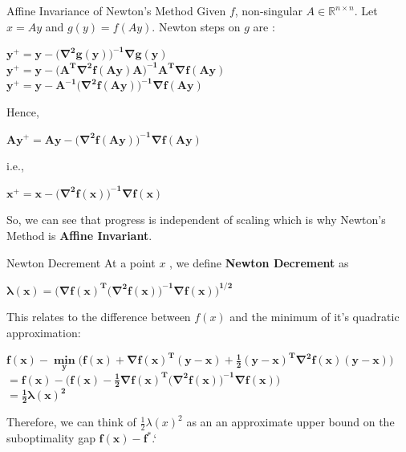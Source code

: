 \documentclass[10pt]{beamer}
\begin{document}
\begin{frame}[fragile]{Affine Invariance of Newton's Method}
 Given $f$, non-singular $A \in \mathbb{R}^{n \times n}$. Let $x=Ay$ and $g(y)=f(Ay)$. Newton steps on $g$ are :
 \begin{center}
     $\boldsymbol{y^{+} = y - \big(\nabla ^{2}g(y)\big)^{-1}\nabla g(y)}$
     \vspace{2mm}\ \\
     $\boldsymbol{y^{+} = y - \big(A^{T}\nabla ^{2}f(Ay)A\big)^{-1}A^{T}\nabla f(Ay)}$
     \vspace{2mm}\ \\
     $\boldsymbol{y^{+} = y - A^{-1}\big(\nabla ^{2}f(Ay)\big)^{-1}\nabla f(Ay)}$
 \end{center}
 Hence,
 \begin{center}
     $\boldsymbol{Ay^{+}=Ay -\big(\nabla ^{2}f(Ay)\big)^{-1}\nabla f(Ay)} $
 \end{center}
 i.e.,
 \begin{center}
     $\boldsymbol{x^{+}=x -\big(\nabla ^{2}f(x)\big)^{-1}\nabla f(x)} $
 \end{center}
 So, we can see that progress is independent of scaling which is why Newton's Method is \textbf{Affine Invariant}. 
\end{frame}

\begin{frame}[fragile]{Newton Decrement}
 At a point $x$ , we define \textbf{Newton Decrement} as 
 \begin{center}
     $\boldsymbol{\lambda(x)=\Big(\nabla f(x)^{T}\big(\nabla^{2}f(x)\big)^{-1}\nabla f(x)\Big)^{1/2}}$
 \end{center}
 This relates to the difference between $f(x)$ and the minimum of it's quadratic approximation:
 \begin{center}
     $\boldsymbol{f(x)-\min\limits_{y}\Big(f(x)+\nabla f(x)^{T}(y-x)+\frac{1}{2}(y-x)^{T}\nabla^{2}f(x)(y-x)\Big)} $
     \vspace{2mm}\ \\
     $\boldsymbol{=f(x)-\Big(f(x)-\frac{1}{2}\nabla f(x)^{T}\big(\nabla^{2}f(x)\big)^{-1}\nabla f(x)\Big)}$
     \vspace{2mm}\ \\
     $\boldsymbol{=\frac{1}{2}\lambda(x)^{2}}$
 \end{center}
 Therefore, we can think of $\frac{1}{2}\lambda(x)^{2}$ as an an approximate upper bound on
the suboptimality gap $\boldsymbol{f(x)-f^{*}}$.`
\end{frame}
\end{document}

